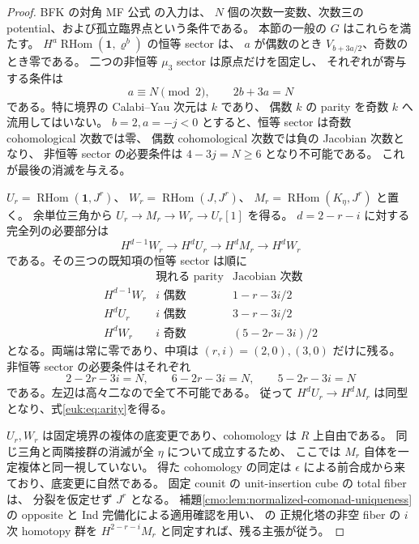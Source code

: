 \begin{proof}
BFK の対角 MF 公式
\cite[Theorem~5.39 and proof, pp.~82--84]{NFBFKKernels}の入力は、
$N$ 個の次数一変数、次数三の potential、および孤立臨界点という条件である。
本節の一般の $G$ はこれらを満たす。
$H^a\operatorname{RHom}(\mathbf1,\varrho^b)$ の恒等 sector は、
$a$ が偶数のとき $V_{b+3a/2}$、奇数のとき零である。
二つの非恒等 $\mu_3$ sector は原点だけを固定し、
それぞれが寄与する条件は
\[
                  a\equiv N\pmod2,\qquad 2b+3a=N
\]
である。特に境界の Calabi--Yau 次元は $k$ であり、
偶数 $k$ の parity を奇数 $k$ へ流用してはいない。
$b=2,a=-j<0$ とすると、恒等 sector は奇数 cohomological 次数では零、
偶数 cohomological 次数では負の Jacobian 次数となり、
非恒等 sector の必要条件は $4-3j=N\ge6$ となり不可能である。
これが最後の消滅を与える。

$U_r=\operatorname{RHom}(\mathbf1,J^r)$、
$W_r=\operatorname{RHom}(J,J^r)$、
$M_r=\operatorname{RHom}(K_\eta,J^r)$ と置く。
余単位三角から $U_r\to M_r\to W_r\to U_r[1]$ を得る。
$d=2-r-i$ に対する完全列の必要部分は
\[
 H^{d-1}W_r\longrightarrow H^dU_r\longrightarrow H^dM_r
       \longrightarrow H^dW_r
\]
である。その三つの既知項の恒等 sector は順に
\[
 \begin{array}{c|c|c}
 &\text{現れる parity}&\text{Jacobian 次数}\\\hline
 H^{d-1}W_r&i\text{ 偶数}&1-r-3i/2\\
 H^dU_r&i\text{ 偶数}&3-r-3i/2\\
 H^dW_r&i\text{ 奇数}&(5-2r-3i)/2
 \end{array}
\]
となる。両端は常に零であり、中項は $(r,i)=(2,0),(3,0)$ だけに残る。
非恒等 sector の必要条件はそれぞれ
\[
 2-2r-3i=N,\qquad 6-2r-3i=N,\qquad 5-2r-3i=N
\]
である。左辺は高々二なので全て不可能である。
従って $H^dU_r\to H^dM_r$ は同型となり、式\eqref{euk:eq:arity}を得る。

$U_r,W_r$ は固定境界の複体の底変更であり、cohomology は $R$ 上自由である。
同じ三角と両隣接群の消滅が全 $\eta$ について成立するため、
ここでは $M_r$ 自体を一定複体と同一視していない。
得た cohomology の同定は $\epsilon$ による前合成から来ており、底変更に自然である。
固定 counit の unit-insertion cube の total fiber は、
分裂を仮定せず $J^r$ となる。
補題\ref{cmo:lem:normalized-comonad-uniqueness}の opposite と Ind 完備化による適用確認を用い、
\cite[Theorem~3.3, Lemma~3.11]{CMOWillumsgaardAssociativity}の
正規化塔の非空 fiber の $i$ 次 homotopy 群を
$H^{2-r-i}M_r$ と同定すれば、残る主張が従う。
\end{proof}

